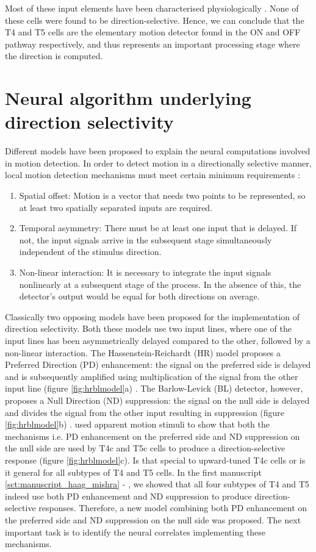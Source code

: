 Most of these input elements have been characterised physiologically \parencite{Arenz2017, Serbe2016, Strother2017, Meier2019, Borst2020, Groschner2022}. None of these cells were found to be direction-selective. Hence, we can conclude that the T4 and T5 cells are the elementary motion detector found in the ON and OFF pathway respectively, and thus represents an important processing stage where the direction is computed.    

\section{Neural algorithm underlying direction selectivity}
Different models have been proposed to explain the neural computations involved in motion detection. In order to detect motion in a directionally selective manner, local motion detection mechanisms must meet certain minimum requirements \parencite{Borst1989}:
\begin{enumerate}
\item Spatial offset: Motion is a vector that needs two points to be represented, so at least two spatially separated inputs are required.
\item Temporal asymmetry: There must be at least one input that is delayed. If not, the input signals arrive in the subsequent stage simultaneously independent of the stimulus direction.
\item Non-linear interaction: It is necessary to integrate the input signals nonlinearly at a subsequent stage of the process. In the absence of this, the detector's output would be equal for both directions on average.
\end{enumerate} 

Classically two opposing models have been proposed for the implementation of direction selectivity. Both these models use two input lines, where one of the input lines has been asymmetrically delayed compared to the other, followed by a non-linear interaction. The Hassenstein-Reichardt (HR) model proposes a Preferred Direction (PD) enhancement: the signal on the preferred side is delayed and is subsequently amplified using multiplication of the signal from the other input line (figure \ref{fig:hrblmodel}a) \parencite{Hassenstein1956}. The Barlow-Levick (BL) detector, however, proposes a Null Direction (ND) suppression: the signal on the null side is delayed and divides the signal from the other input resulting in suppression (figure \ref{fig:hrblmodel}b) \parencite{Barlow1965}. \cite{Haag2016} used apparent motion stimuli to show that both the mechanisms i.e. PD enhancement on the preferred side and ND suppression on the null side are used by T4c and T5c cells to produce a direction-selective response (figure \ref{fig:hrblmodel}c). Is that special to upward-tuned T4c cells or is it general for all subtypes of T4 and T5 cells. In the first manuscript \ref{sct:manuscript_haag_mishra} - \parencite{Haag2017}, we showed that all four subtypes of T4 and T5 indeed use both PD enhancement and ND suppression to produce direction-selective responses. Therefore, a new model combining both PD enhancement on the preferred side and ND suppression on the null side was proposed. The next important task is to identify the neural correlates implementing these mechanisms. 

